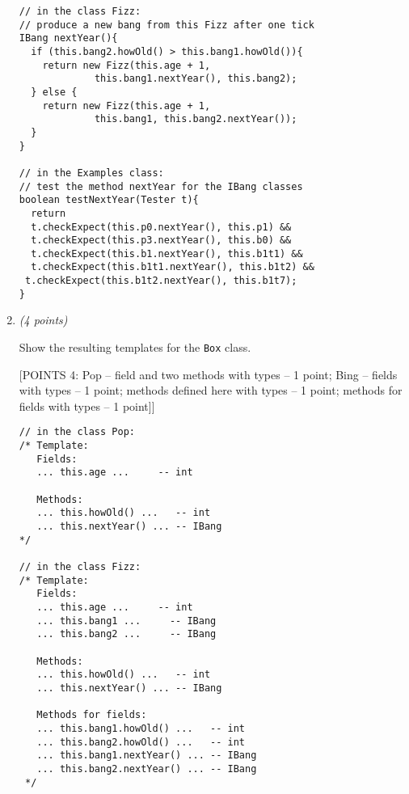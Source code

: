 \documentclass[11pt]{article}
\newcommand\code[1]{\texttt{#1}}
\newcounter{Pctr}
\newenvironment{problem}{\stepcounter{Pctr}%
\begin{description}
\item[\noindent{\bf Problem} \arabic{Pctr}] 
\end{description}}{\relax}
\begin{document}
\begin{problem}
\begin{enumerate}
\begin{verbatim}
// in the class Fizz:
// produce a new bang from this Fizz after one tick
IBang nextYear(){
  if (this.bang2.howOld() > this.bang1.howOld()){
    return new Fizz(this.age + 1, 
             this.bang1.nextYear(), this.bang2);
  } else {
    return new Fizz(this.age + 1, 
             this.bang1, this.bang2.nextYear());
  }
}

// in the Examples class:
// test the method nextYear for the IBang classes
boolean testNextYear(Tester t){
  return
  t.checkExpect(this.p0.nextYear(), this.p1) &&
  t.checkExpect(this.p3.nextYear(), this.b0) &&
  t.checkExpect(this.b1.nextYear(), this.b1t1) &&
  t.checkExpect(this.b1t1.nextYear(), this.b1t2) &&
 t.checkExpect(this.b1t2.nextYear(), this.b1t7);
}
\end{verbatim}
\endsol

\newpage
{}


\newpage
\item {\em{(4 points)}}

Show the resulting templates for the \code{Box} class.

\begsol{\vspace{0.5in}}
[POINTS 4:
  Pop -- field and two methods with types  -- 1 point;
  Bing -- fields with types                -- 1 point;
          methods defined here with types  -- 1 point;
          methods for fields with types    -- 1 point]]

\begin{verbatim}
// in the class Pop:
/* Template:
   Fields:
   ... this.age ...     -- int
   
   Methods:
   ... this.howOld() ...   -- int
   ... this.nextYear() ... -- IBang
*/

// in the class Fizz:
/* Template:
   Fields:
   ... this.age ...     -- int
   ... this.bang1 ...     -- IBang
   ... this.bang2 ...     -- IBang
   
   Methods:
   ... this.howOld() ...   -- int
   ... this.nextYear() ... -- IBang
   
   Methods for fields:
   ... this.bang1.howOld() ...   -- int
   ... this.bang2.howOld() ...   -- int
   ... this.bang1.nextYear() ... -- IBang
   ... this.bang2.nextYear() ... -- IBang   
 */	
\end{verbatim}
\endsol


\end{enumerate}
\end{problem}
\end{document}
